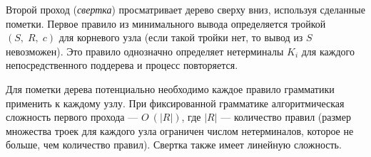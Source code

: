 Второй проход (\emph{свертка}) просматривает дерево сверху вниз, используя сделанные пометки.
Первое правило из минимального вывода определяется тройкой $(S,\;R,\;c)$ для корневого узла
(если такой тройки нет, то вывод из $S$ невозможен).
Это правило однозначно определяет нетерминалы $K_i$ для каждого непосредственного поддерева
и процесс повторяется.

Для пометки дерева потенциально необходимо каждое правило грамматики применить к каждому узлу.
При фиксированной грамматике алгоритмическая сложность первого прохода --- $O\:(|R|)$,
где $|R|$ --- количество правил
(размер множества троек для каждого узла ограничен числом нетерминалов, которое не больше,
чем количество правил). Свертка также имеет линейную сложность.
